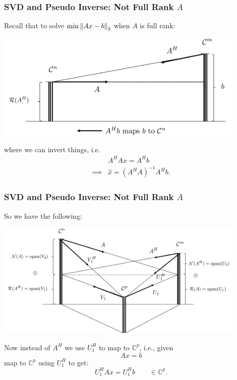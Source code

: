 \documentclass{beamer}
\begin{document}
\begin{frame}\frametitle{SVD and Pseudo Inverse: Not Full Rank $A$}
	\par{}
	
	Recall that to solve $\min\left\|Ax-b\right\|_2$ when $A$ is full rank:
	\begin{center}
		\includegraphics[width=0.9\textwidth]
			{figures/chap7_svd_2}
	\end{center}
	where we can invert things, i.e.
	\begin{align*}
		& A^HAx = A^Hb \\
		\implies & \hat{x} = (A^H A)^{-1} A^H b.
	\end{align*}
\end{frame}

\begin{frame}\frametitle{SVD and Pseudo Inverse: Not Full Rank $A$}
	So we have the following:
	\begin{center}
		\includegraphics[width=0.9\textwidth]
			{figures/chap7_svd_1}
	\end{center}
	Now instead of $A^H$ we use $U_1^H$ to map to $\mathbb{C}^p$, i.e., given
	\[ 
		Ax = b
	\]
	map to $\mathbb{C}^p$ using $U_1^H$ to get:
	\[
		U_1^HAx = U_1^Hb \qquad \in\mathbb{C}^p.
	\]	
\end{frame}
\end{document}
